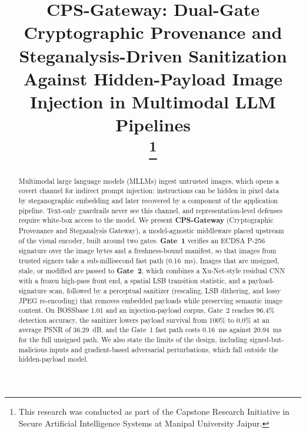 \documentclass[conference]{IEEEtran}
\begin{document}
\title{\LARGE\bfseries CPS-Gateway: Dual-Gate Cryptographic Provenance and Steganalysis-Driven Sanitization Against Hidden-Payload Image Injection in Multimodal LLM Pipelines\\
\thanks{This research was conducted as part of the Capstone Research Initiative in Secure Artificial Intelligence Systems at Manipal University Jaipur.}
}

\author{
}

\maketitle
\thispagestyle{plain}
\pagestyle{plain}

\begin{abstract}
Multimodal large language models (MLLMs) ingest untrusted images, which opens a covert channel for indirect prompt injection: instructions can be hidden in pixel data by steganographic embedding and later recovered by a component of the application pipeline. Text-only guardrails never see this channel, and representation-level defenses require white-box access to the model. We present \textbf{CPS-Gateway} (Cryptographic Provenance and Steganalysis Gateway), a model-agnostic middleware placed upstream of the visual encoder, built around two gates. \textbf{Gate~1} verifies an ECDSA P-256 signature over the image bytes and a freshness-bound manifest, so that images from trusted signers take a sub-millisecond fast path (0.16~ms). Images that are unsigned, stale, or modified are passed to \textbf{Gate~2}, which combines a Xu-Net-style residual CNN with a frozen high-pass front end, a spatial LSB transition statistic, and a payload-signature scan, followed by a perceptual sanitizer (rescaling, LSB dithering, and lossy JPEG re-encoding) that removes embedded payloads while preserving semantic image content. On BOSSbase 1.01 and an injection-payload corpus, Gate~2 reaches 96.4\% detection accuracy, the sanitizer lowers payload survival from 100\% to 0.0\% at an average PSNR of 36.29~dB, and the Gate~1 fast path costs 0.16~ms against 20.94~ms for the full unsigned path. We also state the limits of the design, including signed-but-malicious inputs and gradient-based adversarial perturbations, which fall outside the hidden-payload model.
\end{abstract}
\end{document}
